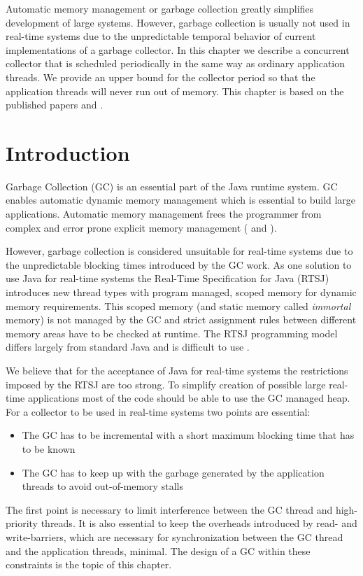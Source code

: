 Automatic memory management or garbage collection greatly simplifies
development of large systems. However, garbage collection is usually
not used in real-time systems due to the unpredictable temporal
behavior of current implementations of a garbage collector. In this
chapter we describe a concurrent collector that is scheduled
periodically in the same way as ordinary application threads. We
provide an upper bound for the collector period so that the
application threads will never run out of memory. This chapter is
based on the published papers \cite{jop:rtgc_sched} and
\cite{jop:scjgc}.


\section{Introduction}

Garbage Collection (GC) is an essential part of the Java runtime
system. GC enables automatic dynamic memory management which is
essential to build large applications. Automatic memory management
frees the programmer from complex and error prone explicit memory
management ( and ).

However, garbage collection is considered unsuitable for real-time
systems due to the unpredictable blocking times introduced by the GC
work. As one solution to use Java for real-time systems the
Real-Time Specification for Java (RTSJ) \cite{rtsj} introduces new
thread types with program managed, scoped memory for dynamic memory
requirements. This scoped memory (and static memory called
\emph{immortal} memory) is not managed by the GC and strict
assignment rules between different memory areas have to be checked
at runtime. The RTSJ programming model differs largely from standard
Java and is difficult to use \cite{Niessner03,
conf/isorc/PizloFHV04}.

We believe that for the acceptance of Java for real-time systems the
restrictions imposed by the RTSJ are too strong. To simplify
creation of possible large real-time applications most of the code
should be able to use the GC managed heap. For a collector to be
used in real-time systems two points are essential:
\begin{itemize}
    \item The GC has to be incremental with a short maximum blocking time
    that has to be known
    \item The GC has to keep up with the garbage generated by the
    application threads to avoid out-of-memory stalls
\end{itemize}
The first point is necessary to limit interference between the GC
thread and high-priority threads. It is also essential to keep the
overheads introduced by read- and write-barriers, which are
necessary for synchronization between the GC thread and the
application threads, minimal. The design of a GC within these
constraints is the topic of this chapter.

